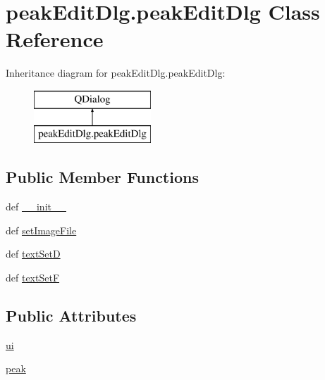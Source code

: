 \hypertarget{classpeak_edit_dlg_1_1peak_edit_dlg}{\section{peak\-Edit\-Dlg.\-peak\-Edit\-Dlg Class Reference}
\label{classpeak_edit_dlg_1_1peak_edit_dlg}
}
Inheritance diagram for peak\-Edit\-Dlg.\-peak\-Edit\-Dlg\-:\begin{figure}[H]
\begin{center}
\leavevmode
\includegraphics[height=2.000000cm]{classpeak_edit_dlg_1_1peak_edit_dlg}
\end{center}
\end{figure}
\subsection*{Public Member Functions}
\begin{DoxyCompactItemize}
\item 
def \hyperlink{classpeak_edit_dlg_1_1peak_edit_dlg_a3a89be502d41175fb5b75fd419715096}{\-\_\-\-\_\-init\-\_\-\-\_\-}
\item 
def \hyperlink{classpeak_edit_dlg_1_1peak_edit_dlg_ab11967324093e3350fe404fa29e255c1}{set\-Image\-File}
\item 
def \hyperlink{classpeak_edit_dlg_1_1peak_edit_dlg_a2f577ff67c33813f4d803e5d85e62eb2}{text\-Set\-D}
\item 
def \hyperlink{classpeak_edit_dlg_1_1peak_edit_dlg_a2dc064d39d748e09a70a7f6a236c7187}{text\-Set\-F}
\end{DoxyCompactItemize}
\subsection*{Public Attributes}
\begin{DoxyCompactItemize}
\item 
\hyperlink{classpeak_edit_dlg_1_1peak_edit_dlg_a0220ea9f1c4703a47098891c57e1da1f}{ui}
\item 
\hyperlink{classpeak_edit_dlg_1_1peak_edit_dlg_abd94cfb1dd7a9ed84e1955b100a0be78}{peak}
\end{DoxyCompactItemize}


